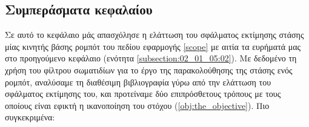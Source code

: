 \subsection{Συμπεράσματα κεφαλαίου}
\label{subsection:02_02_05:01}

Σε αυτό το κεφάλαιο μάς απασχόλησε η ελάττωση του σφάλματος εκτίμησης στάσης
μίας κινητής βάσης ρομπότ του πεδίου εφαρμογής \ref{scope} με αιτία τα ευρήματά
μας στο προηγούμενο κεφάλαιο (ενότητα \ref{subsection:02_01_05:02}). Με
δεδομένο τη χρήση του φίλτρου σωματιδίων για το έργο της παρακολούθησης της
στάσης ενός ρομπότ, αναλύσαμε τη διαθέσιμη βιβλιογραφία γύρω από την ελάττωση
του σφάλματος εκτίμησης του, και προτείναμε δύο επιπρόσθετους τρόπους με τους
οποίους είναι εφικτή η ικανοποίηση του στόχου (\ref{obj:the_objective}). Πιο
συγκεκριμένα:

